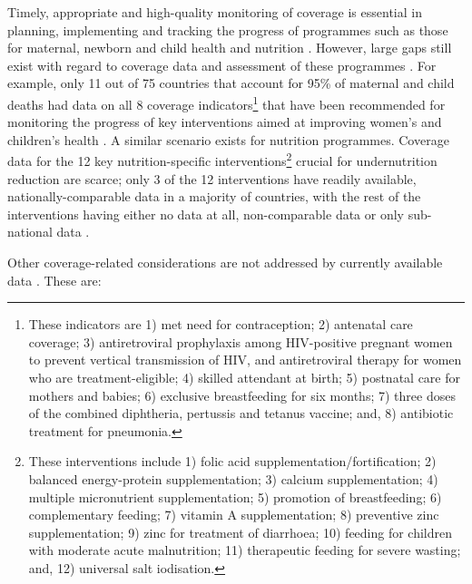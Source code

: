 \documentclass[12pt,a4paper]{article}
\let\rmarkdownfootnote\footnote%
\def\footnote{\protect\rmarkdownfootnote}
\begin{document}
Timely, appropriate and high-quality monitoring of coverage is essential in planning, implementing and tracking the progress of programmes such as those for maternal, newborn and child health and nutrition \citep{Bryce:2013dd}. However, large gaps still exist with regard to coverage data and assessment of these programmes \citep{Bryce:2008kf, Bryce:2013dd, InternationalFoodPolicyResearchInstitute:2014wj}. For example, only 11 out of 75 countries that account for 95\% of maternal and child deaths had data on all 8 coverage indicators\footnote{These indicators are 1) met need for contraception; 2) antenatal care coverage; 3) antiretroviral prophylaxis among HIV-positive pregnant women to prevent vertical transmission of HIV, and antiretroviral therapy for women who are treatment-eligible; 4) skilled attendant at birth; 5) postnatal care for mothers and babies; 6) exclusive breastfeeding for six months; 7) three doses of the combined diphtheria, pertussis and tetanus vaccine; and, 8) antibiotic treatment for pneumonia.} that have been recommended for monitoring the progress of key interventions aimed at improving women's and children's health \citep{independentExpertReviewGrouponInformationandAccountabilityforWomensandChildrensHealth:2013uc}. A similar scenario exists for nutrition programmes. Coverage data for the 12 key nutrition-specific interventions\footnote{These interventions include 1) folic acid supplementation/fortification; 2) balanced energy-protein supplementation; 3) calcium supplementation; 4) multiple micronutrient supplementation; 5) promotion of breastfeeding; 6) complementary feeding; 7) vitamin A supplementation; 8) preventive zinc supplementation; 9) zinc for treatment of diarrhoea; 10) feeding for children with moderate acute malnutrition; 11) therapeutic feeding for severe wasting; and, 12) universal salt iodisation.} crucial for undernutrition reduction \citep{Bhutta:2008p10829, Bhutta:2013ks, Bhutta:2013cf, InternationalFoodPolicyResearchInstitute:2014wj} are scarce; only 3 of the 12 interventions have readily available, nationally-comparable data in a majority of countries, with the rest of the interventions having either no data at all, non-comparable data or only sub-national data \citep{InternationalFoodPolicyResearchInstitute:2014wj}.

Other coverage-related considerations are not addressed by currently available data \citep{Guevarra:2014ta}. These are:
\end{document}
